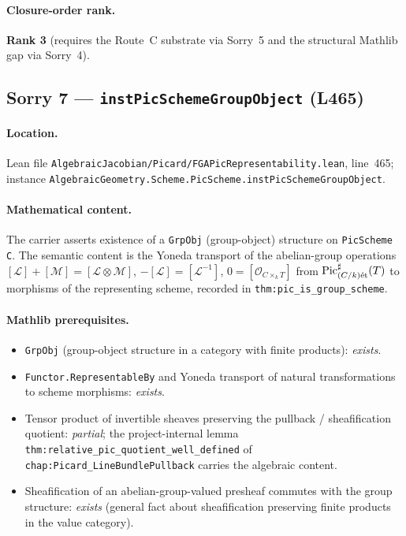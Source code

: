 \paragraph{Closure-order rank.} \textbf{Rank 3} (requires the
Route~C substrate via Sorry~5 and the structural Mathlib gap via
Sorry~4).

\subsection{Sorry 7 --- \texttt{instPicSchemeGroupObject} (L465)}
\label{subsec:sorry_pic_scheme_group_object}

\paragraph{Location.} Lean file
\texttt{AlgebraicJacobian/Picard/FGAPicRepresentability.lean},
line~465; instance
\texttt{AlgebraicGeometry.Scheme.PicScheme.instPicSchemeGroupObject}.

\paragraph{Mathematical content.} The carrier asserts existence of a
\texttt{GrpObj} (group-object) structure on \texttt{PicScheme C}.
The semantic content is the Yoneda transport of the abelian-group
operations $[\mathcal{L}] + [\mathcal{M}] = [\mathcal{L} \otimes \mathcal{M}]$,
$-[\mathcal{L}] = [\mathcal{L}^{-1}]$,
$0 = [\mathcal{O}_{C \times_k T}]$ from
$\operatorname{Pic}^\sharp_{(C/k)\mathrm{\acute{e}t}}(T)$ to morphisms of the representing scheme,
recorded in \texttt{thm:pic_is_group_scheme}.

\paragraph{Mathlib prerequisites.}
\begin{itemize}
  \item \texttt{GrpObj} (group-object structure in a category with
    finite products): \emph{exists}.
  \item \texttt{Functor.RepresentableBy} and Yoneda transport of
    natural transformations to scheme morphisms: \emph{exists}.
  \item Tensor product of invertible sheaves preserving the
    pullback / sheafification quotient: \emph{partial}; the
    project-internal lemma
    \texttt{thm:relative_pic_quotient_well_defined} of
    \texttt{chap:Picard_LineBundlePullback} carries the algebraic
    content.
  \item Sheafification of an abelian-group-valued presheaf commutes
    with the group structure: \emph{exists} (general fact about
    sheafification preserving finite products in the value category).
\end{itemize}

